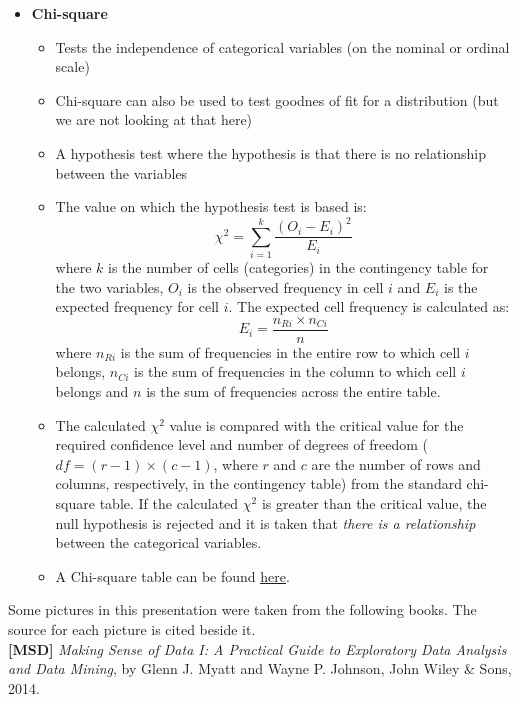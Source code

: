 \begin{itemize}
\begin{itemize}
  \end{itemize}
  \newpage

\item \textbf{Chi-square} 
  \begin{itemize}
  \item Tests the independence of categorical variables (on the nominal or ordinal scale)
  \item Chi-square can also be used to test goodnes of fit for a distribution (but we are not looking at that here)
  \item A hypothesis test where the hypothesis is that there is no relationship between the variables
  \item The value on which the hypothesis test is based is: \\
    $$ \chi^2 = \sum_{i=1}^k\dfrac{(O_i - E_i)^2}{E_i} $$
    where $k$ is the number of cells (categories) in the contingency table for the two variables, $O_i$ is the observed frequency in cell $i$ and $E_i$ is the expected frequency for cell $i$. The expected cell frequency is calculated as:
    $$ E_i = \dfrac{n_{Ri} \times n_{Ci}}{n} $$
    where $n_{Ri}$ is the sum of frequencies in the entire row to which cell $i$ belongs, $n_{Ci}$ is the sum of frequencies in the column to which cell $i$ belongs and $n$ is the sum of frequencies across the entire table.
  \item The calculated $\chi^2$ value is compared with the critical value for the required confidence level and number of degrees of freedom ($df=(r-1)\times(c-1)$, where $r$ and $c$ are the number of rows and columns, respectively, in the contingency table) from the standard chi-square table. If the calculated $\chi^2$ is greater than the critical value, the null hypothesis is rejected and it is taken that \emph{there is a relationship} between the categorical variables.
    \item A Chi-square table can be found \underline{\href{http://303bha.duckdns.org/tudt/da/res/files/Labs/2\%20Relationships/images/2_1_1_chi_square_distribution_table.png}{here}}. 
  \end{itemize}
  \newpage
\end{itemize}


\newpage
{}
Some pictures in this presentation were taken from the following books. The source for each picture is cited beside it. \\

\textbf{[MSD]} \emph{Making Sense of Data I: A Practical Guide to Exploratory Data Analysis and Data Mining}, by Glenn J. Myatt and Wayne P. Johnson, John Wiley \& Sons, 2014. \\





